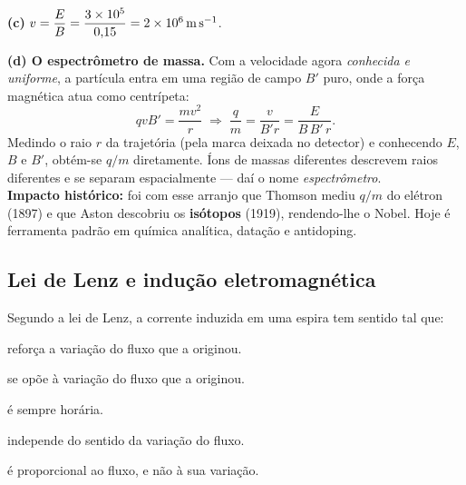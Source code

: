 \begin{questao}[3]{}
{\textbf{(c)} $v = \dfrac{E}{B} = \dfrac{3\times 10^{5}}{0{,}15}
= 2\times 10^{6}\,\si{\meter\per\second}$.

\textbf{(d) O espectrômetro de massa.} Com a velocidade agora \emph{conhecida e
uniforme}, a partícula entra em uma região de campo $B'$ puro, onde a força
magnética atua como centrípeta:
\[
qvB' = \frac{mv^{2}}{r}
\;\Longrightarrow\;
\frac{q}{m}=\frac{v}{B'r}=\frac{E}{B\,B'\,r}.
\]
Medindo o raio $r$ da trajetória (pela marca deixada no detector) e conhecendo
$E$, $B$ e $B'$, obtém-se $q/m$ diretamente. Íons de massas diferentes descrevem
raios diferentes e se separam espacialmente --- daí o nome
\emph{espectrômetro}.\\
\textbf{Impacto histórico:} foi com esse arranjo que Thomson mediu $q/m$ do
elétron (1897) e que Aston descobriu os \textbf{isótopos} (1919), rendendo-lhe o
Nobel. Hoje é ferramenta padrão em química analítica, datação e antidoping.}
\end{questao}




\subsection{Lei de Lenz e indução eletromagnética}

\blocofixacao

\begin{questao}[1]{}
Segundo a lei de Lenz, a corrente induzida em uma espira tem sentido tal que:
\begin{alternativas}
\item reforça a variação do fluxo que a originou.
\item se opõe à variação do fluxo que a originou.
\item é sempre horária.
\item independe do sentido da variação do fluxo.
\item é proporcional ao fluxo, e não à sua variação.
\end{alternativas}
\end{questao}

